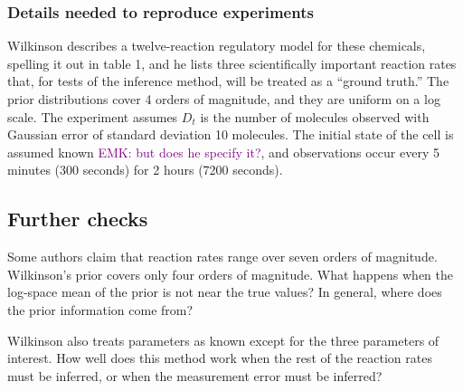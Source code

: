 \documentclass{article}
\newcommand\EMK[1]{\textcolor{purple}{EMK: #1}}
\begin{document}
\subsubsection{Details needed to reproduce experiments}
Wilkinson describes a twelve-reaction regulatory model for these chemicals, spelling it out in table 1, and he lists three scientifically important reaction rates that, for tests of the inference method, will be treated as a ``ground truth.'' The prior distributions cover 4 orders of magnitude, and they are uniform on a log scale. The experiment assumes $D_t$ is the number of molecules observed with Gaussian error of standard deviation 10 molecules. %
The initial state of the cell is assumed known \EMK{but does he specify it?}, and observations occur every 5 minutes (300 seconds) for 2 hours (7200 seconds). 



 \subsection{Further checks}
Some authors \cite{protein_interaction} claim that reaction rates range over seven orders of magnitude. Wilkinson's prior covers only four orders of magnitude. What happens when the log-space mean of the prior is not near the true values? In general, where does the prior information come from?

Wilkinson also treats parameters as known except for the three parameters of interest. How well does this method work when the rest of the reaction rates must be inferred, or when the measurement error must be inferred?
\end{document}
